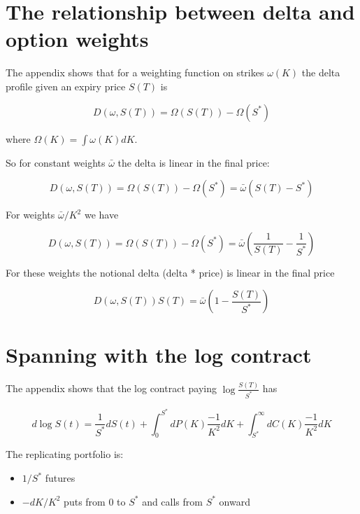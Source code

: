 \documentclass[12pt]{article}
\begin{document}



\section{The relationship between delta and option weights}

The appendix shows that for a weighting function on strikes $\omega(K)$ the delta profile given an expiry price $S(T)$ is 

\begin{equation*}
 D(\omega, S(T)) =  \Omega(S(T)) - \Omega(S^*) 
\end{equation*}

where $\Omega(K) = \int \omega(K)dK$. 

So for constant weights $\bar{\omega}$ the delta is linear in the final price:

\begin{equation*}
 D(\omega, S(T)) =  \Omega(S(T)) - \Omega(S^*) = \bar{\omega} \left( S(T)-S^* \right) 
\end{equation*}

For weights $\bar{\omega}/K^2$ we have

\begin{equation*}
 D(\omega, S(T)) =  \Omega(S(T)) - \Omega(S^*) = \bar{\omega} \left( \frac{1}{S(T)}-\frac{1}{S^*} \right) 
\end{equation*}

For these weights the notional delta (delta * price) is linear in the final price

\begin{equation}
 D(\omega, S(T))S(T) = \bar{\omega} \left( 1-\frac{S(T)}{S^*} \right) \label{eq:NotionalDeltaProfile}
\end{equation}


\section{Spanning with the log contract}

The appendix shows that the log contract paying $\log \frac{S(T)}{S^*}$ has

\[d \log S(t) = \frac{1}{S^*}dS(t) + \int_0^{S^*}d P(K) \frac{-1}{K^2}dK + \int_{S^*}^{\infty}dC(K) \frac{-1}{K^2}dK  \]

The replicating portfolio is: 

\begin{itemize}
    \item $1/S^*$ futures
    \item $-dK/K^2$ puts from 0 to $S^*$ and calls from $S^*$ onward 
\end{itemize}
\end{document}
